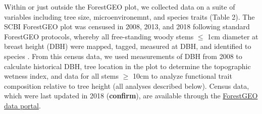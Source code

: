 \documentclass[]{article}
\begin{document}
Within or just outside the ForestGEO plot, we collected data on a suite
of variables including tree size, microenvironemnt, and species traits
(Table 2). The SCBI ForestGEO plot was censused in 2008, 2013, and 2018
following standard ForestGEO protocols, whereby all free-standing woody
stems \(\le\) 1cm diameter at breast height (DBH) were mapped, tagged,
measured at DBH, and identified to species \citep{condit_tropical_1998}.
From this census data, we used measurements of DBH from 2008 to
calculate historical DBH, tree location in the plot to determine the
topographic wetness index, and data for all stems \(\ge\) 10cm to
analyze functional trait composition relative to tree height (all
analyses described below). Census data, which were last updated in 2018
(\textbf{confirm}), are available through the
\href{www.forestgeo.si.edu}{ForestGEO data portal}.
\end{document}
